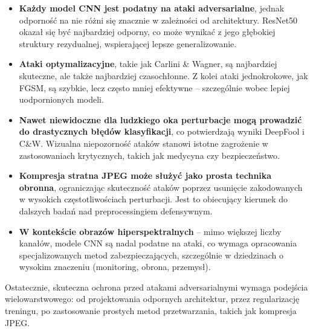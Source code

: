 \documentclass{article}
\begin{document}
\begin{itemize}
    \item \textbf{Każdy model CNN jest podatny na ataki adversarialne}, jednak odporność na nie różni się znacznie w zależności od architektury. ResNet50 okazał się być najbardziej odporny, co może wynikać z jego głębokiej struktury rezydualnej, wspierającej lepsze generalizowanie.

    \item \textbf{Ataki optymalizacyjne}, takie jak Carlini \& Wagner, są najbardziej skuteczne, ale także najbardziej czasochłonne. Z kolei ataki jednokrokowe, jak FGSM, są szybkie, lecz często mniej efektywne – szczególnie wobec lepiej uodpornionych modeli.

    \item \textbf{Nawet niewidoczne dla ludzkiego oka perturbacje mogą prowadzić do drastycznych błędów klasyfikacji}, co potwierdzają wyniki DeepFool i C\&W. Wizualna niepozorność ataków stanowi istotne zagrożenie w zastosowaniach krytycznych, takich jak medycyna czy bezpieczeństwo.

    \item \textbf{Kompresja stratna JPEG może służyć jako prosta technika obronna}, ograniczając skuteczność ataków poprzez usunięcie zakodowanych w wysokich częstotliwościach perturbacji. Jest to obiecujący kierunek do dalszych badań nad preprocessingiem defensywnym.

    \item \textbf{W kontekście obrazów hiperspektralnych} – mimo większej liczby kanałów, modele CNN są nadal podatne na ataki, co wymaga opracowania specjalizowanych metod zabezpieczających, szczególnie w dziedzinach o wysokim znaczeniu (monitoring, obrona, przemysł).
\end{itemize}

Ostatecznie, skuteczna ochrona przed atakami adversarialnymi wymaga podejścia wielowarstwowego: od projektowania odpornych architektur, przez regularizację treningu, po zastosowanie prostych metod przetwarzania, takich jak kompresja JPEG.



\printbibliography
\end{document}
